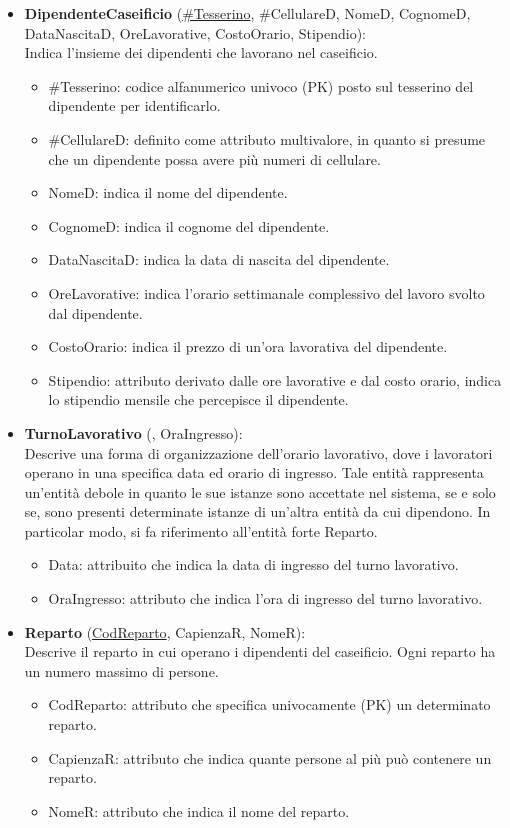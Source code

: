 \documentclass[12pt]{report}
\begin{document}
\begin{itemize}
\item \textbf{DipendenteCaseificio} (\underline{\#Tesserino}, \#CellulareD, NomeD, CognomeD, DataNascitaD, OreLavorative, CostoOrario, Stipendio):\\
Indica l’insieme dei dipendenti che lavorano nel caseificio.
\begin{itemize}
\item \#Tesserino: codice alfanumerico univoco (PK) posto sul tesserino del dipendente per identificarlo.
\item \#CellulareD: definito come attributo multivalore, in quanto si presume che un dipendente possa avere più numeri di cellulare.
\item NomeD: indica il nome del dipendente.
\item CognomeD: indica il cognome del dipendente.
\item DataNascitaD: indica la data di nascita del dipendente.
\item OreLavorative: indica l'orario settimanale complessivo del lavoro svolto dal dipendente.
\item CostoOrario: indica il prezzo di un’ora lavorativa del dipendente.
\item Stipendio:  attributo derivato dalle ore lavorative e dal costo orario, indica lo stipendio mensile che percepisce il dipendente.

\end{itemize}
\item \textbf{TurnoLavorativo} ({}, OraIngresso):\\
Descrive una forma di organizzazione dell’orario lavorativo, dove i lavoratori operano in una specifica data ed orario di ingresso. Tale entità rappresenta un’entità debole in quanto le sue istanze sono accettate nel sistema, se e solo se, sono presenti determinate istanze di un’altra entità da cui dipendono. In particolar modo, si fa riferimento all’entità forte Reparto.  
\begin{itemize}
\item Data: attribuito che indica la data di ingresso del turno lavorativo.
\item OraIngresso: attributo che indica l’ora di ingresso del turno lavorativo.
\end{itemize}

\item \textbf{Reparto} (\underline{CodReparto}, CapienzaR, NomeR):\\
Descrive il reparto in cui operano i dipendenti del caseificio. Ogni reparto ha un numero massimo di persone.
\begin{itemize}
\item CodReparto: attributo che specifica univocamente (PK) un determinato reparto.
\item CapienzaR: attributo che indica quante persone al più può contenere un reparto.
\item NomeR: attributo che indica il nome del reparto.
\end{itemize}


\end{itemize}
\end{document}
